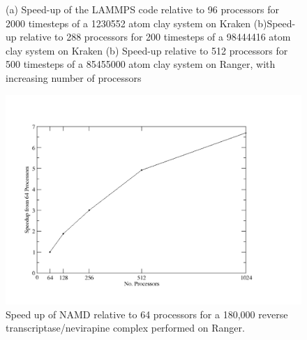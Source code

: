\documentclass[a4paper,10pt]{article}
\begin{document}
\begin{figure} [h]
\begin{centering}
{	}
        \end{centering}
\caption{(a) Speed-up of the LAMMPS code relative to 96 processors for
 2000 timesteps of a 1230552 atom
clay system on Kraken (b)Speed-up relative to 288 processors for 200 timesteps of a 98444416 atom clay system on Kraken
 (b) Speed-up relative to 512 processors for 500 timesteps of a 85455000 atom clay system on Ranger, with increasing number of processors }
\label{F:scaling}
\end{figure}

%
\begin{figure}
  \begin{center}
    \includegraphics[width=0.84\linewidth]{subproject2-hiv/ranger_scale}
    \caption{Speed up of NAMD relative to 64 processors for a 180,000 reverse transcriptase/nevirapine complex performed on Ranger.}
    \label{fig:scale_ranger}
  \end{center}
\end{figure}
\end{document}
